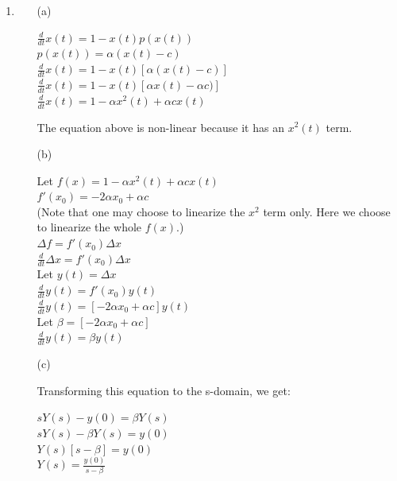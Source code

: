 \documentclass{article}
\begin{document}
\begin{enumerate}
\item

\begin{itemize}
\item[(a)] \smallbreak

\noindent ${\frac{d}{dt}}x(t) = 1 - x(t)p(x(t))$\\
\noindent $p(x(t)) = \alpha(x(t) - c)$\\
\noindent ${\frac{d}{dt}}x(t) = 1 - x(t)[\alpha (x(t) - c)]$\\
\noindent ${\frac{d}{dt}}x(t) = 1 - x(t)[\alpha x(t) - \alpha c)]$\\
\noindent ${\frac{d}{dt}}x(t) = 1 -\alpha x^2(t) + \alpha cx(t)$
\bigbreak

\noindent The equation above is non-linear because it has an
$x^2(t)$ term. \bigbreak


\item[(b)] \smallbreak



\noindent Let $f(x) = 1 -\alpha x^2(t) + \alpha cx(t)$\\
\noindent $f'(x_0) = -2 \alpha x_0 + \alpha c$  \\ 
(Note that one may choose to linearize the $x^2$ term only. Here we choose to linearize the whole $f(x)$.) \\
\noindent $\Delta f = f'(x_0) \Delta x$\\
\noindent ${\frac{d}{dt}} \Delta x = f'(x_0) \Delta x$\\
\noindent Let $y(t) = \Delta x$\\
\noindent ${\frac{d}{dt}} y(t) = f'(x_0) y(t)$\\
\noindent ${\frac{d}{dt}} y(t) = [-2 \alpha x_0 + \alpha c]y(t)$\\
\noindent Let $\beta = [-2 \alpha x_0 + \alpha c]$\\
\noindent ${\frac{d}{dt}} y(t) = \beta y(t)$ \bigbreak

\item[(c)] \smallbreak

\noindent Transforming this equation to the s-domain, we get:
\smallbreak

\noindent $sY(s) -y(0) = \beta Y(s)$\\
\noindent $sY(s) - \beta Y(s) = y(0)$\\
\noindent $Y(s)[s - \beta] = y(0)$\\
\noindent $Y(s) = {\frac{y(0)}{s - \beta}}$ \bigbreak


\end{itemize}
\end{enumerate}
\end{document}
